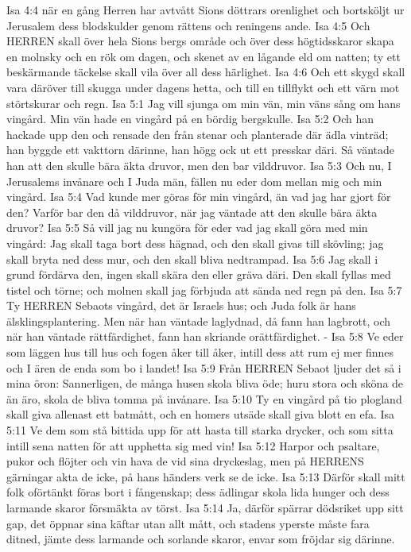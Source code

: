 Isa 4:4  när en gång Herren har avtvått Sions döttrars orenlighet och bortsköljt ur Jerusalem dess blodskulder genom rättens och reningens ande.
Isa 4:5  Och HERREN skall över hela Sions bergs område och över dess högtidsskaror skapa en molnsky och en rök om dagen, och skenet av en lågande eld om natten; ty ett beskärmande täckelse skall vila över all dess härlighet.
Isa 4:6  Och ett skygd skall vara däröver till skugga under dagens hetta, och till en tillflykt och ett värn mot störtskurar och regn.
Isa 5:1  Jag vill sjunga om min vän, min väns sång om hans vingård. Min vän hade en vingård på en bördig bergskulle.
Isa 5:2  Och han hackade upp den och rensade den från stenar och planterade där ädla vinträd; han byggde ett vakttorn därinne, han högg ock ut ett presskar däri. Så väntade han att den skulle bära äkta druvor, men den bar vilddruvor.
Isa 5:3  Och nu, I Jerusalems invånare och I Juda män, fällen nu eder dom mellan mig och min vingård.
Isa 5:4  Vad kunde mer göras för min vingård, än vad jag har gjort för den? Varför bar den då vilddruvor, när jag väntade att den skulle bära äkta druvor?
Isa 5:5  Så vill jag nu kungöra för eder vad jag skall göra med min vingård: Jag skall taga bort dess hägnad, och den skall givas till skövling; jag skall bryta ned dess mur, och den skall bliva nedtrampad.
Isa 5:6  Jag skall i grund fördärva den, ingen skall skära den eller gräva däri. Den skall fyllas med tistel och törne; och molnen skall jag förbjuda att sända ned regn på den.
Isa 5:7  Ty HERREN Sebaots vingård, det är Israels hus; och Juda folk är hans älsklingsplantering. Men när han väntade laglydnad, då fann han lagbrott, och när han väntade rättfärdighet, fann han skriande orättfärdighet. -
Isa 5:8  Ve eder som läggen hus till hus och fogen åker till åker, intill dess att rum ej mer finnes och I ären de enda som bo i landet!
Isa 5:9  Från HERREN Sebaot ljuder det så i mina öron: Sannerligen, de många husen skola bliva öde; huru stora och sköna de än äro, skola de bliva tomma på invånare.
Isa 5:10  Ty en vingård på tio plogland skall giva allenast ett batmått, och en homers utsäde skall giva blott en efa.
Isa 5:11  Ve dem som stå bittida upp för att hasta till starka drycker, och som sitta intill sena natten för att upphetta sig med vin!
Isa 5:12  Harpor och psaltare, pukor och flöjter och vin hava de vid sina dryckeslag, men på HERRENS gärningar akta de icke, på hans händers verk se de icke.
Isa 5:13  Därför skall mitt folk oförtänkt föras bort i fångenskap; dess ädlingar skola lida hunger och dess larmande skaror försmäkta av törst.
Isa 5:14  Ja, därför spärrar dödsriket upp sitt gap, det öppnar sina käftar utan allt mått, och stadens yperste måste fara ditned, jämte dess larmande och sorlande skaror, envar som fröjdar sig därinne.

